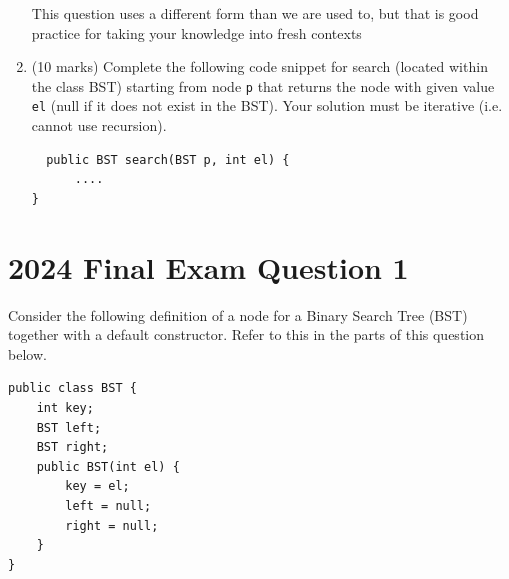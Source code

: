 \documentclass[twoside=false,DIV=14]{scrartcl}
\begin{document}
\begin{enumerate}
\begin{note}
This question uses a different form than we are used to, but that is good practice for taking your knowledge into fresh contexts
\end{note}
\item (10 marks) Complete the following code snippet for search (located within the class BST) starting from node \verb+p+ that returns the node with given value \verb+el+ (null if it does not exist in the BST). Your solution must be iterative (i.e. cannot use recursion).
\begin{lstlisting}
  public BST search(BST p, int el) {
      ....
}
\end{lstlisting}
\end{enumerate}
 

\section{2024 Final Exam Question 1}
Consider the following definition of a node for a Binary Search Tree (BST) together with a default constructor. Refer to this in the parts of this question below.
\begin{lstlisting}
public class BST {
    int key;
    BST left;
    BST right;
    public BST(int el) {
        key = el;
        left = null;
        right = null;
    }
}
\end{lstlisting}
\end{document}
